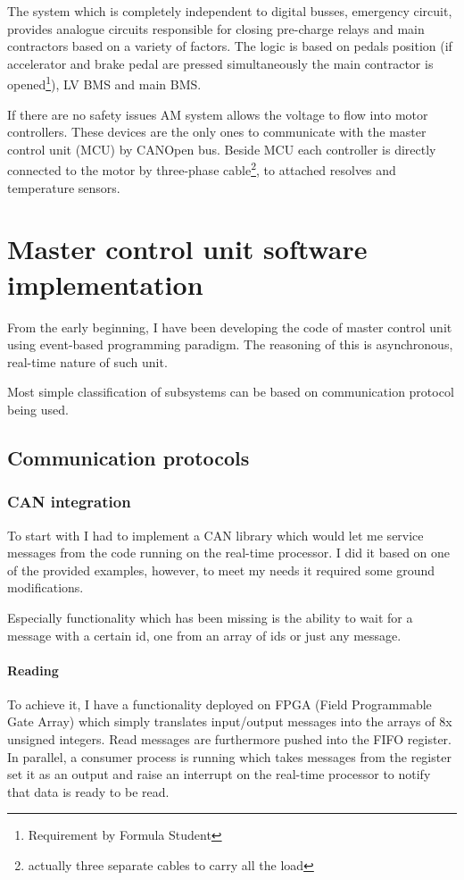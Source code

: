 The system which is completely independent to digital busses, emergency circuit, provides analogue circuits responsible for closing pre-charge relays and main contractors based on a variety of factors. The logic is based on pedals position (if accelerator and brake pedal are pressed simultaneously the main contractor is opened\footnote{Requirement by Formula Student}), LV BMS and main BMS.

If there are no safety issues AM system allows the voltage to flow into motor controllers. These devices are the only ones to communicate with the master control unit (MCU) by CANOpen bus. Beside MCU each controller is directly connected to the motor by three-phase cable\footnote{actually three separate cables to carry all the load}, to attached resolves and temperature sensors.

\section{Master control unit software implementation}
From the early beginning, I have been developing the code of master control unit using event-based programming paradigm. The reasoning of this is asynchronous, real-time nature of such unit.

Most simple classification of subsystems can be based on communication protocol being used. 

\subsection{Communication protocols}

\subsubsection{CAN integration}
To start with I had to implement a CAN library which would let me service messages from the code running on the real-time processor. I did it based on one of the provided examples, however, to meet my needs it required some ground modifications.

Especially functionality which has been missing is the ability to wait for a message with a certain id, one from an array of ids or just any message. 
\paragraph{Reading}

To achieve it, I have a functionality deployed on FPGA (Field Programmable Gate Array) which simply translates input/output messages into the arrays of 8x unsigned integers. Read messages are furthermore pushed into the FIFO register. In parallel, a consumer process is running which takes messages from the register set it as an output and raise an interrupt on the real-time processor to notify that data is ready to be read.

